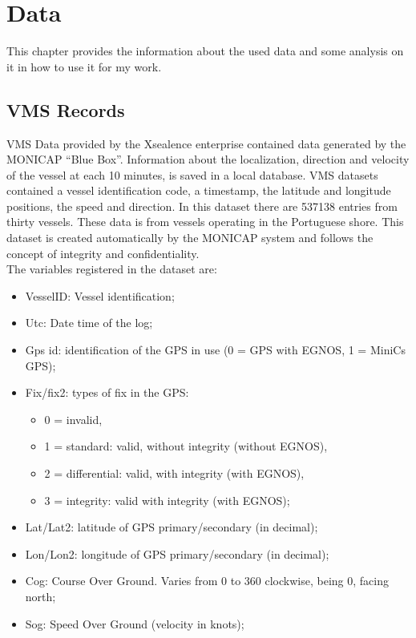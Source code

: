 % 
%  
%
\chapter{Data}
\label{cha:data}
This chapter provides the information about the used data and some analysis on it in how to use it for my work.

\section{VMS Records} %
\label{sec:vms_records}

VMS Data provided by the Xsealence enterprise contained data generated by the MONICAP “Blue Box”. Information about the localization, direction and velocity of the vessel at each 10 minutes, is saved in a local database. VMS datasets contained a vessel identification code, a timestamp, the latitude and longitude positions, the speed and direction. In this dataset there are 537138 entries from thirty vessels. These data is from vessels operating in the Portuguese shore.  
This dataset is created automatically by the MONICAP system and follows the concept of integrity and confidentiality.\\
The variables registered in the dataset are:
\begin{itemize}
\item VesselID: Vessel identification;
\item	Utc: Date time of the log;
\item	Gps \textemdash id: identification of the GPS in use (0 = GPS with EGNOS, 1 = MiniCs GPS);
\item	Fix/fix2: types of fix in the GPS:
\begin{itemize}
\item	0 = invalid, 
\item	1 = standard: valid, without integrity (without EGNOS), 
\item	2 = differential: valid, with integrity (with EGNOS), 
\item	3 = integrity: valid with integrity (with EGNOS);
\end{itemize}
\item	Lat/Lat2: latitude of GPS primary/secondary (in decimal);
\item	Lon/Lon2: longitude of GPS primary/secondary (in decimal);
\item	Cog: Course Over Ground. Varies from 0 to 360 clockwise, being 0, facing north;
\item	Sog: Speed Over Ground (velocity in knots);


\end{itemize}


